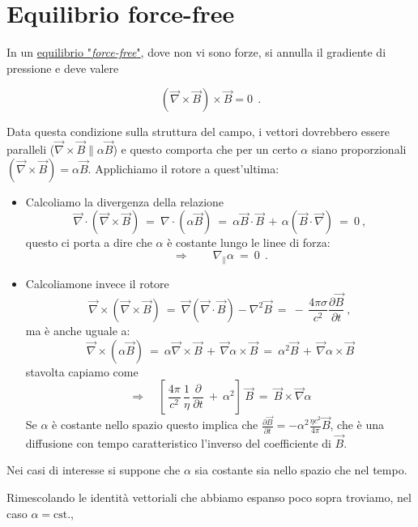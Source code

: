 %
%
%
\section{Equilibrio force-free}
\fboxrule=1pt

In un \underline{equilibrio "\emph{force-free}"}, dove non vi sono forze, si annulla il gradiente di pressione e deve valere 

\begin{equation}
\boxed{\left(\vec \nabla \times \vec B \right)\times \vec B =0}\ \ .
\end{equation}

Data questa condizione sulla struttura del campo, i vettori dovrebbero essere paralleli ($\vec \nabla \times \vec B \parallel\alpha \vec B$) e questo comporta che per un certo $\alpha$ siano proporzionali $\left(\vec \nabla \times \vec B \right)=\alpha \vec B$. Applichiamo il rotore a quest'ultima:


\begin{itemize}
	\item Calcoliamo la divergenza della relazione \[\vec \nabla\cdot \left(\vec \nabla\times \vec B\right)\ =\ \nabla \cdot \left(\alpha \vec B\right)\ =\ \alpha \vec B\cdot \vec B\, +\, \alpha\left(\vec B\cdot \vec \nabla \right)\ =\ 0\ ,\] 
	questo ci porta a dire che $\alpha$ è costante lungo le linee di forza:  
	\[\Rightarrow \qquad \nabla_\parallel \alpha\ =\ 0\ \ .\] 
	\item Calcoliamone invece il rotore \[\vec \nabla \times \left(\vec \nabla \times \vec B \right)\ =\ \vec\nabla (\vec\nabla\cdot\vec B) - \nabla^2 \vec B\ =\ -\, \frac{4\pi\sigma}{c^2}\frac{\partial \vec B}{\partial t}\ ,\] 
	ma è anche uguale a:
	\[\vec \nabla \times (\alpha \vec B)\ =\ \alpha \vec \nabla\times \vec B\, +\, \vec \nabla\alpha \times \vec B\ =\ \alpha^2 \vec B\, +\, \vec \nabla\alpha \times \vec B \]
	stavolta capiamo come 
	\[ \Rightarrow\quad \left[\, \frac{4\pi}{c^2}\,\frac{1}{\eta}\,\frac{\partial }{\partial t}\ +\ \alpha^2\right]\ \vec B\ =\ \vec B\times \vec \nabla\alpha \]
	Se $\alpha$ è costante nello spazio questo implica che $\frac{\partial \vec B}{\partial t} = -\alpha^2\frac{\eta c^2}{4\pi}\vec B$, che è una diffusione con tempo caratteristico l'inverso del coefficiente di $\vec B$.
\end{itemize}

Nei casi di interesse si suppone che $\alpha$ sia costante sia nello spazio che nel tempo.

Rimescolando le identità vettoriali che abbiamo espanso poco sopra troviamo, nel caso $\alpha = \text{cst.}$, 

